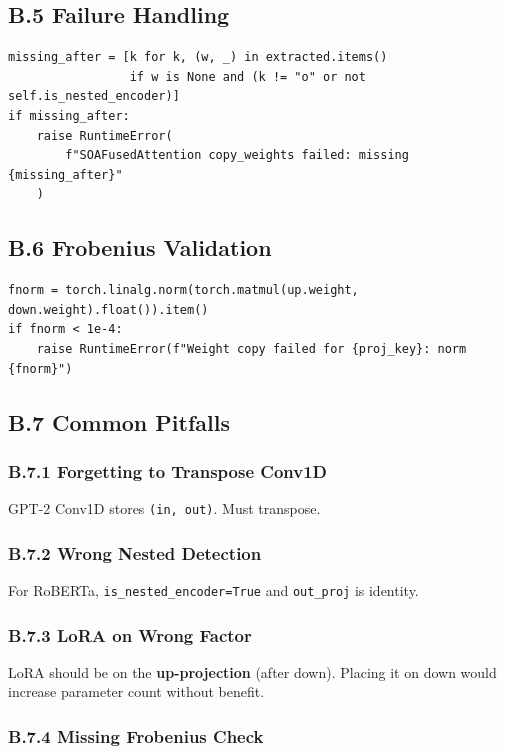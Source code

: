 \subsection{B.5 Failure Handling}

\begin{lstlisting}
missing_after = [k for k, (w, _) in extracted.items() 
                 if w is None and (k != "o" or not self.is_nested_encoder)]
if missing_after:
    raise RuntimeError(
        f"SOAFusedAttention copy_weights failed: missing {missing_after}"
    )
\end{lstlisting}

\subsection{B.6 Frobenius Validation}

\begin{lstlisting}
fnorm = torch.linalg.norm(torch.matmul(up.weight, down.weight).float()).item()
if fnorm < 1e-4:
    raise RuntimeError(f"Weight copy failed for {proj_key}: norm {fnorm}")
\end{lstlisting}

\subsection{B.7 Common Pitfalls}

\subsubsection{B.7.1 Forgetting to Transpose Conv1D}

GPT-2 Conv1D stores \texttt{(in, out)}. Must transpose.

\subsubsection{B.7.2 Wrong Nested Detection}

For RoBERTa, \texttt{is\_nested\_encoder=True} and \texttt{out\_proj} is identity.

\subsubsection{B.7.3 LoRA on Wrong Factor}

LoRA should be on the \textbf{up-projection} (after down). Placing it on down 
would increase parameter count without benefit.

\subsubsection{B.7.4 Missing Frobenius Check}

